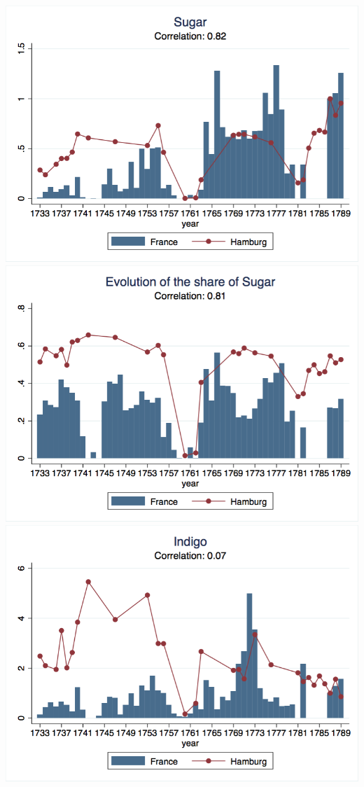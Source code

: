 \documentclass[12pt,a4paper,titlepage,english]{article}
\begin{document}
\includegraphics[scale=.28]{sugar_long.png}
\includegraphics[scale=.28]{sugar_share_long.png}\\
\includegraphics[scale=.28]{indigo_long.png}
\end{document}
